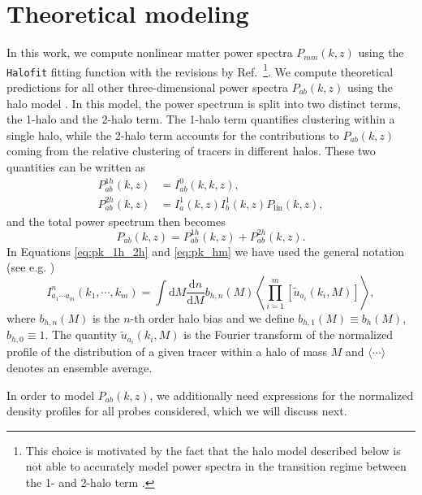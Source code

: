 \documentclass[%
 reprint,
nofootinbib,
 amsmath,amssymb,
 aps,
]{revtex4-1}
\begin{document}
\section{Theoretical modeling}\label{sec:theory}

In this work, we compute nonlinear matter power spectra $P_{mm}(k, z)$ using the \texttt{Halofit} fitting function \cite{Smith:2003} with the revisions by Ref.~\cite{Takahashi:2012}\footnote{This choice is motivated by the fact that the halo model described below is not able to accurately model power spectra in the transition regime between the 1- and 2-halo term \cite{Mead:2015}.}. We compute theoretical predictions for all other three-dimensional power spectra $P_{ab}(k, z)$ using the halo model \cite{Ma:2000, Peacock:2000, Seljak:2000, Cooray:2002}. In this model, the power spectrum is split into two distinct terms, the 1-halo and the 2-halo term. The 1-halo term quantifies clustering within a single halo, while the 2-halo term accounts for the contributions to $P_{ab}(k, z)$ coming from the relative clustering of tracers in different halos. These two quantities can be written as
\begin{equation}
\begin{aligned}
P^{1h}_{ab}(k, z) &= I^{0}_{ab}(k, k, z), \\
P^{2h}_{ab}(k, z) &= I^{1}_{a}(k, z) I^{1}_{b}(k, z) P_{\mathrm{lin}}(k, z), 
\label{eq:pk_1h_2h}
\end{aligned}
\end{equation}
and the total power spectrum then becomes
\begin{equation}
P_{ab}(k, z) = P^{1h}_{ab}(k, z) + P^{2h}_{ab}(k, z).
\label{eq:pk_hm}
\end{equation}
In Equations \ref{eq:pk_1h_2h} and \ref{eq:pk_hm} we have used the general notation (see e.g. \cite{Cooray:2001, Krause:2017})
\begin{equation}
I^{n}_{a_1\cdots a_m}(k_1,\cdots,k_m) = \int \mathrm{d}M \frac{\mathrm{d}n}{\mathrm{d}M}b_{h, n}(M) \left\langle\prod_{i=1}^m \left[\tilde{u}_{a_{i}}(k_{i}, M) \right]\right\rangle, 
\label{eq:halo-mod-intg}
\end{equation}
where $b_{h, n}(M)$ is the $n$-th order halo bias and we define $b_{h,1}(M)\equiv b_{h}(M)$, $b_{h,0}\equiv1$. The quantity $\tilde{u}_{a_{i}}(k_{i}, M)$ is the Fourier transform of the normalized profile of the distribution of a given tracer within a halo of mass $M$ and $\langle \cdots \rangle$ denotes an ensemble average.

In order to model $P_{ab}(k, z)$, we additionally need expressions for the normalized density profiles for all probes considered, which we will discuss next.
\end{document}
